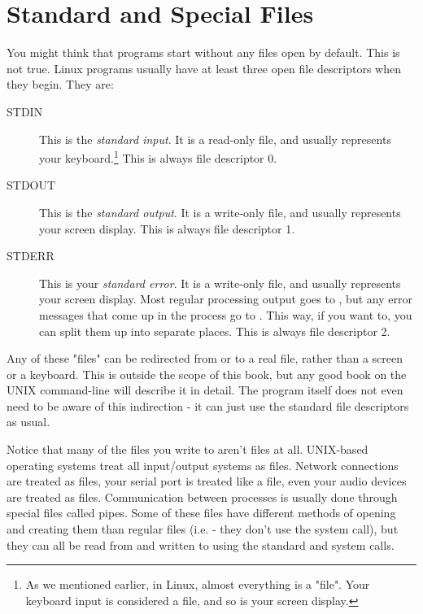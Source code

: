 \section{Standard and Special Files}

You might think that programs start without any files open by default.  This
is not true.  Linux programs usually have at least three open file descriptors 
when they begin.  They are:

\begin{description}
\item[STDIN] This is the \emph{standard input}.  It is a read-only file, and 
usually represents your keyboard.\footnote{As we mentioned earlier, in Linux, almost everything is a "file".  Your keyboard input is considered a file, and so is your screen display.
}
This is always file descriptor 0.
\item[STDOUT] This is the \emph{standard output}.  It is a write-only file, 
and usually represents your screen display.  This is always file descriptor 1.
\item[STDERR] This is your \emph{standard error}.  It is a write-only file, 
and usually represents your screen display.  Most regular processing 
output goes to , but any error messages that come 
up in the process go to .  This way, if you want to, 
you can split them up into separate places.  This is always file
descriptor 2.
\end{description}

Any of these "files" can be redirected from or to a real file, rather
than a screen or a keyboard.  This is outside the scope of this book, but
any good book on the UNIX command-line will describe it in detail.
The program itself does not even need to be aware of this indirection - 
it can just use the standard file descriptors as usual.  

Notice that many of the files you write to aren't files at all.  UNIX-based
operating systems treat all input/output systems as files.  Network connections
are treated as files, your serial port is treated like a file, even your audio
devices are treated as files.  Communication between processes is 
usually done through special files called pipes.   Some of these files have different methods of opening
and creating them than regular files (i.e. - they don't use the  system call), but they can all be read from and
written to using the standard  and 
 system calls.

